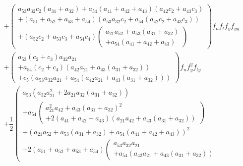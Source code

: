 \documentclass[a4paper,oneside]{book}
\numberwithin{equation}{chapter}
\begin{document}
\begin{align}
\begin{array}{l}
 + \left( \begin{array}{l}
{a_{53}}{a_{32}}{c_2}\left( {{a_{31}} + {a_{32}}} \right) + {a_{54}}\left( {{a_{41}} + {a_{42}} + {a_{43}}} \right)\left( {{a_{42}}{c_2} + {a_{43}}{c_3}} \right)\\
 + \left( {{a_{51}} + {a_{52}} + {a_{53}} + {a_{54}}} \right)\left( {{a_{53}}{a_{32}}{c_2} + {a_{54}}\left( {{a_{42}}{c_2} + {a_{43}}{c_3}} \right)} \right)\\
 + \left( {{a_{52}}{c_2} + {a_{53}}{c_3} + {a_{54}}{c_4}} \right)\left( \begin{array}{l}
{a_{21}}{a_{52}} + {a_{53}}\left( {{a_{31}} + {a_{32}}} \right)\\
 + {a_{54}}\left( {{a_{41}} + {a_{42}} + {a_{43}}} \right)
\end{array} \right)
\end{array} \right){f_n}{f_t}{f_y}{f_{yy}}\\
 + \left( \begin{array}{l}
{a_{53}}\left( {{c_2} + {c_3}} \right){a_{32}}{a_{21}}\\
 + {a_{54}}\left( {{c_2} + {c_4}} \right)\left( {{a_{42}}{a_{21}} + {a_{43}}\left( {{a_{31}} + {a_{32}}} \right)} \right)\\
 + {c_5}\left( {{a_{53}}{a_{32}}{a_{21}} + {a_{54}}\left( {{a_{42}}{a_{21}} + {a_{43}}\left( {{a_{31}} + {a_{32}}} \right)} \right)} \right)
\end{array} \right){f_n}f_y^2{f_{ty}}\\
 + \dfrac{1}{2}\left( \begin{array}{l}
{a_{53}}\left( {{a_{32}}a_{21}^2 + 2{a_{21}}{a_{32}}\left( {{a_{31}} + {a_{32}}} \right)} \right)\\
 + {a_{54}}\left( \begin{array}{l}
a_{21}^2{a_{42}} + {a_{43}}{\left( {{a_{31}} + {a_{32}}} \right)^2}\\
 + 2\left( {{a_{41}} + {a_{42}} + {a_{43}}} \right)\left( {{a_{21}}{a_{42}} + {a_{43}}\left( {{a_{31}} + {a_{32}}} \right)} \right)
\end{array} \right)\\
 + {\left( {{a_{21}}{a_{52}} + {a_{53}}\left( {{a_{31}} + {a_{32}}} \right) + {a_{54}}\left( {{a_{41}} + {a_{42}} + {a_{43}}} \right)} \right)^2}\\
 + 2\left( {{a_{51}} + {a_{52}} + {a_{53}} + {a_{54}}} \right)\left( \begin{array}{l}
{a_{53}}{a_{32}}{a_{21}}\\
 + {a_{54}}\left( {{a_{42}}{a_{21}} + {a_{43}}\left( {{a_{31}} + {a_{32}}} \right)} \right)

\end{array}
\end{array}
\end{array}
\end{align}
\end{document}
